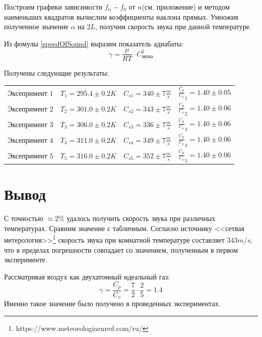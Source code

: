 \documentclass{article}
\begin{document}
Построим графики зависимости $f_{n}-f_{0}$ от $n$(см. приложение) и методом наименьших квадратов вычислим коэффициенты наклона прямых. Умножив полученное значение $\alpha$ на $2L$, получим скорость звука при данной температуре.

Из фомулы \eqref{speedOfSound} выразим показатель адиабаты:
\begin{equation}
    \gamma = \frac{\mu}{R T} \cdot C_{\text{звука}}^2
\end{equation}

Получены следующие результаты:
\newpage
\begin{table}[h]
\centering
\begin{tabular}{ l c c r }
$ \text{Эксепримент 1} $ & $T_{1} = 295.4 \pm 0.2 K$ & $C_{s1} = 340 \pm 7 \frac{m}{s}$ & $\frac{C_{p}}{C_{v}}_{1} = 1.40 \pm 0.05 $\\
$ \text{Эксепримент 2} $ & $T_{2} = 301.0 \pm 0.2 K$ & $C_{s2} = 343 \pm 7 \frac{m}{s}$ & $\frac{C_{p}}{C_{v}}_{2} = 1.40 \pm 0.06 $\\
$  \text{Эксепримент 3}$ & $T_{3} = 306.0 \pm 0.2 K$ & $C_{s3} = 336 \pm 7 \frac{m}{s}$ & $\frac{C_{p}}{C_{v}}_{3} = 1.40 \pm 0.06 $\\
$ \text{Эксепримент 4} $ & $T_{4} = 311.0 \pm 0.2 K$ & $C_{s4} = 349 \pm 7 \frac{m}{s}$ & $\frac{C_{p}}{C_{v}}_{4} = 1.40 \pm 0.06 $\\
$ \text{Эксепримент 5} $ & $T_{5} = 316.0 \pm 0.2 K$ & $C_{s5} = 352 \pm 7 \frac{m}{s}$ & $\frac{C_{p}}{C_{v}}_{5} = 1.40 \pm 0.06 $\\
\end{tabular}
\end{table}
\section{Вывод}
С точностью $\approx 2\%$ удалось получить скорость звука при различных температурах. 
Сравним значение с табличным. Согласно источнику <<сетвая метерология>>\footnote{https://www.meteorologiaenred.com/ru/} скорость звука при комнатной температуре составляет $343 m/s$, что в пределах погрешности совпадает со значением, полученным в первом эксперименте.

Рассматривая воздух как двухатомный идеальный газ:
\begin{equation*}
    \gamma = \frac{C_p}{C_v} = \frac{7}{2} \cdot \frac{2}{5} = 1.4
\end{equation*}
Именно такое значение было получено в проведенных экспериментах.
\end{document}
